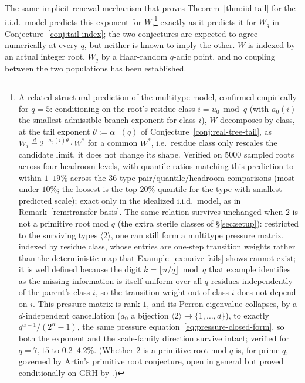 \documentclass[11pt]{article}
\theoremstyle{remark}
\begin{document}
The same implicit-renewal mechanism that proves Theorem~\ref{thm:iid-tail}
for the i.i.d.\ model predicts this exponent for $W$,\footnote{A related
structural prediction of the multitype model,
confirmed empirically for $q=5$: conditioning on the root's residue
class $i=u_0\bmod q$ (with $a_0(i)$ the smallest admissible branch
exponent for class $i$), $W$ decomposes by class, at the tail exponent
$\theta:=\alpha_-(q)$ of Conjecture~\ref{conj:real-tree-tail}, as
$W_i\stackrel{d}{=}2^{-a_0(i)\theta}\cdot W^*$ for a common $W^*$,
i.e.\ residue class only rescales the candidate limit, it does not
change its shape.
Verified on $5000$ sampled roots across four headroom levels, with
quantile ratios matching this prediction to within $1$--$19\%$ across
the $36$ type-pair/quantile/headroom comparisons (most under $10\%$;
the loosest is the top-$20\%$ quantile for the type with smallest
predicted scale); exact
only in the idealized i.i.d.\ model, as in Remark~\ref{rem:transfer-basis}.
The same relation survives unchanged when $2$ is not a primitive root
mod $q$ (the extra sterile classes of \S\ref{sec:setup}): restricted
to the surviving types $\langle2\rangle$, one can still form a
multitype pressure matrix, indexed by residue class, whose entries are
one-step transition weights rather than the deterministic map that
Example~\ref{ex:naive-fails} shows cannot exist; it is well defined
because the digit $k=\lfloor u/q\rfloor\bmod q$ that example
identifies as the missing information is itself uniform over all $q$
residues independently of the parent's class $i$, so the transition
weight out of class $i$ does not depend on $i$. This pressure matrix
is rank $1$, and its Perron eigenvalue collapses, by a
$d$-independent cancellation ($a_0$ a bijection
$\langle2\rangle\to\{1,\ldots,d\}$), to exactly $q^{\alpha-1}/(2^\alpha-1)$, the
same pressure equation~\eqref{eq:pressure-closed-form}, so both the exponent and the
scale-family direction survive intact; verified for $q=7,15$ to
$0.2$--$4.2\%$. (Whether $2$ is a primitive root mod $q$ is, for prime
$q$, governed by Artin's primitive root conjecture, open in general
but proved conditionally on GRH by \cite{Hooley1967}.)}
exactly as it
predicts it for $W_q$ in Conjecture~\ref{conj:tail-index}; the two
conjectures are expected to agree numerically at every $q$, but neither
is known to imply the other. $W$ is indexed by an actual integer root,
$W_q$ by a Haar-random $q$-adic point, and no coupling between the two
populations has been established.
\end{document}
